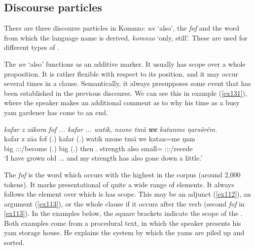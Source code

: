 \subsection{Discourse particles} \label{discourse-particles}
There are three discourse particles in Komnzo: \emph{we} `also', the  \emph{fof} and the word from which the language name is derived, \emph{komnzo} `only, still'. These are used for different types of .

The  \emph{we} `also' functions as an additive  marker. It usually has scope over a whole proposition. It is rather flexible with respect to its position, and it may occur several times in a clause. Semantically, it always presupposes some event that has been established in the previous discourse. We can see this in example (\ref{ex131}), where the speaker makes an additional comment as to why his time as a busy yam gardener has come to an end.

\begin{exe}
	\ex \emph{kafar z zäkora fof ... kafar ... watik, nzone tmä \textbf{we} katanme ŋarsörém.}\\
	\gll kafar z zäa fof (.) kafar (.) watik nzone tmä we katan=me ŋam\\
	big {\Iam} \Fsg:\Sbj:\Pst:\Pfv/become {\Emph} (.) big (.) then \Fsg{}.{\Poss} strength also small={\Ins} \Stsg:\Sbj:\Rpst:\Dur/recede\\
	\trans `I have grown old ... and my strength has also gone down a little.'\\ 
	\label{ex131}
\end{exe}

The  \emph{fof} is the word which occurs with the highest  in the corpus (around 2,000 tokens). It marks presentational  of quite a wide range of elements. It always follows the element over which is has scope. This may be an adjunct (\ref{ex112}), an argument (\ref{ex113}), or the whole clause if it occurs after the verb (second \emph{fof} in \ref{ex113}). In the examples below, the square brackets indicate the scope of the . Both examples come from a procedural text, in which the speaker presents his yam storage house. He explains the system by which the yams are piled up and sorted.

